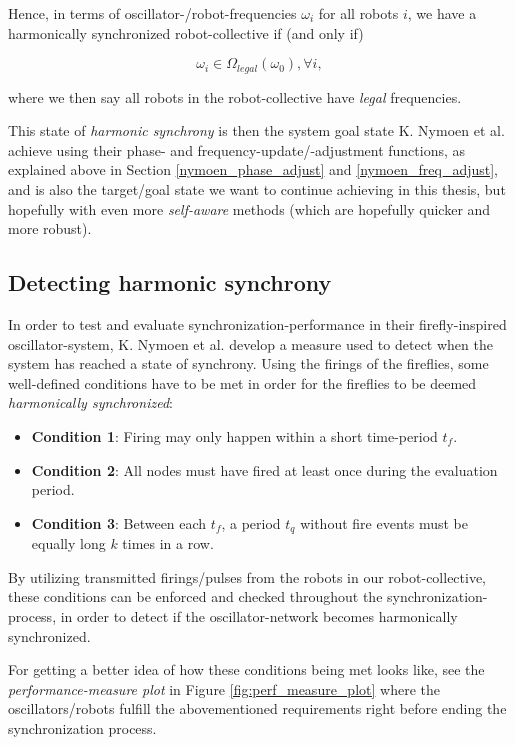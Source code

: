 Hence, in terms of oscillator-/robot-frequencies $\omega_i$ for all robots $i$, we have a harmonically synchronized robot-collective if (and only if)

\begin{equation}\label{synced_freqs}
\omega_i \in \Omega_{legal}(\omega_0) , \forall i ,
\end{equation}

where we then say all robots in the robot-collective have \textit{legal} frequencies.



This state of \textit{harmonic synchrony} is then the system goal state K. Nymoen et al. achieve using their phase- and frequency-update/-adjustment functions, as explained above in Section \ref{nymoen_phase_adjust} and \ref{nymoen_freq_adjust}, and is also the target/goal state we want to continue achieving in this thesis, but hopefully with even more \textit{self-aware} methods (which are hopefully quicker and more robust).


	\subsection{Detecting harmonic synchrony}
	\label{subsec:harmonic_synchrony}
	In order to test and evaluate synchronization-performance in their firefly-inspired oscillator-system, K. Nymoen et al. \cite{nymoen_synch} develop a measure used to detect when the system has reached a state of synchrony. Using the firings of the fireflies, some well-defined conditions have to be met in order for the fireflies to be deemed \textit{harmonically synchronized}:
	\begin{itemize}
		\item \textbf{Condition 1}: Firing may only happen within a short time-period $t_f$.
		\item \textbf{Condition 2}: All nodes must have fired at least once during the evaluation period.
		\item \textbf{Condition 3}: Between each $t_f$, a period $t_q$ without fire events must be equally long $k$ times in a row.
	\end{itemize}
	
	By utilizing transmitted firings/pulses from the robots in our robot-collective, these conditions can be enforced and checked throughout the synchronization-process, in order to detect if the oscillator-network becomes harmonically synchronized.
	
	For getting a better idea of how these conditions being met looks like, see the \textit{performance-measure plot} in Figure \ref{fig:perf_measure_plot} where the oscillators/robots fulfill the abovementioned requirements right before ending the synchronization process.
	
